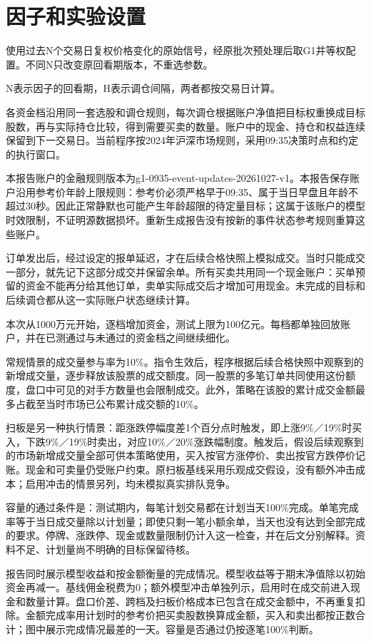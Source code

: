 \documentclass[UTF8,10pt,a4paper,fontset=fandol]{ctexart}
\begin{document}
\section*{因子和实验设置}
使用过去N个交易日复权价格变化的原始信号，经原批次预处理后取G1并等权配置。不同N只改变原回看期版本，不重选参数。

N表示因子的回看期，H表示调仓间隔，两者都按交易日计算。



各资金档沿用同一套选股和调仓规则，每次调仓根据账户净值把目标权重换成目标股数，再与实际持仓比较，得到需要买卖的数量。账户中的现金、持仓和权益连续保留到下一交易日。当前程序按2024年沪深市场规则，采用09:35决策时点和约定的执行窗口。

本报告账户的金融规则版本为g1-0935-event-updates-20261027-v1。本报告保存账户沿用参考价年龄上限规则：参考价必须严格早于09:35、属于当日早盘且年龄不超过30秒。因此正常静默也可能产生年龄超限的待定量目标；这属于该账户的模型时效限制，不证明源数据损坏。重新生成报告没有按新的事件状态参考规则重算这些账户。

订单发出后，经过设定的报单延迟，才在后续合格快照上模拟成交。当时只能成交一部分，就先记下这部分成交并保留余单。所有买卖共用同一个现金账户：买单预留的资金不能再分给其他订单，卖单实际成交后才增加可用现金。未完成的目标和后续调仓都从这一实际账户状态继续计算。

本次从1000万元开始，逐档增加资金，测试上限为100亿元。每档都单独回放账户，并在已测通过与未通过的资金档之间继续细化。

常规情景的成交量参与率为10\%。指令生效后，程序根据后续合格快照中观察到的新增成交量，逐步释放该股票的成交额度。同一股票的多笔订单共同使用这份额度，盘口中可见的对手方数量也会限制成交。此外，策略在该股的累计成交金额最多占截至当时市场已公布累计成交额的10\%。

扫板是另一种执行情景：距涨跌停幅度差1个百分点时触发，即上涨9\%／19\%时买入，下跌9\%／19\%时卖出，对应10\%／20\%涨跌幅制度。触发后，假设后续观察到的市场新增成交量全部可供本策略使用，买入按官方涨停价、卖出按官方跌停价记账。现金和可卖量仍受账户约束。原扫板基线采用乐观成交假设，没有额外冲击成本；启用冲击的情景另列，均未模拟真实排队竞争。

容量的通过条件是：测试期内，每笔计划交易都在计划当天100\%完成。单笔完成率等于当日成交量除以计划量；即使只剩一笔小额余单，当天也没有达到全部完成的要求。停牌、涨跌停、现金或数量限制仍计入这一检查，并在后文分别解释。资料不足、计划量尚不明确的目标保留待核。

报告同时展示模型收益和按金额衡量的完成情况。模型收益等于期末净值除以初始资金再减一。基线佣金税费为0；额外模型冲击单独列示，启用时在成交前进入现金和数量计算。盘口价差、跨档及扫板价格成本已包含在成交金额中，不再重复扣除。金额完成率用计划时的参考价把买卖股数换算成金额，买入和卖出都按正数合计；图中展示完成情况最差的一天。容量是否通过仍按逐笔100\%判断。
\end{document}
